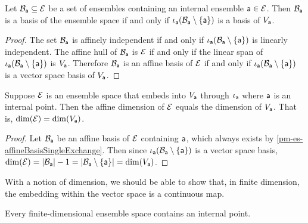 \begin{mathSection}
\begin{prop}
	Let $\mathcal{B}_{\ens[a]} \subseteq \Ens$ be a set of ensembles containing an internal ensemble $\ens[a] \in \Ens$. Then $\mathcal{B}_{\ens[a]}$ is a basis of the ensemble space if and only if $\iota_{\ens[a]}(\mathcal{B}_{\ens[a]}\setminus\{\ens[a]\})$ is a basis of $V_{\ens[a]}$.
\end{prop}

\begin{proof}
	The set $\mathcal{B}_{\ens[a]}$ is affinely independent if and only if $\iota_{\ens[a]}(\mathcal{B}_{\ens[a]}\setminus\{\ens[a]\})$ is linearly independent. The affine hull of $\mathcal{B}_{\ens[a]}$ is $\Ens$ if and only if the linear span of $\iota_{\ens[a]}(\mathcal{B}_{\ens[a]}\setminus\{\ens[a]\})$ is $V_{\ens[a]}$. Therefore $\mathcal{B}_{\ens[a]}$ is an affine basis of $\Ens$ if and only if $\iota_{\ens[a]}(\mathcal{B}_{\ens[a]}\setminus\{\ens[a]\})$ is a vector space basis of $V_{\ens[a]}$.
\end{proof}

\begin{coro}
	Suppose $\Ens$ is an ensemble space that embeds into $V_{\ens[a]}$ through $\iota_{\ens[a]}$ where $\ens[a]$ is an internal point. Then the affine dimension of $\Ens$ equals the dimension of $V_{\ens[a]}$. That is, $\dim(\Ens) = \dim(V_{\ens[a]})$.
\end{coro}

\begin{proof}
	Let $\mathcal{B}_{\ens[a]}$ be an affine basis of $\Ens$ containing $\ens[a]$, which always exists by \ref{pm-es-affineBasisSingleExchange}. Then since $\iota_{\ens[a]}(\mathcal{B}_{\ens[a]}\setminus\{\ens[a]\})$ is a vector space basis, $\dim(\Ens) = |\mathcal{B}_{\ens[a]}| - 1 = |\mathcal{B}_{\ens[a]}\setminus\{\ens[a]\}| = \dim(V_{\ens[a]})$.
\end{proof}

\end{mathSection}

With a notion of dimension, we should be able to show that, in finite dimension, the embedding within the vector space is a continuous map.

\begin{prop}
	Every finite-dimensional ensemble space contains an internal point. 
\end{prop}

